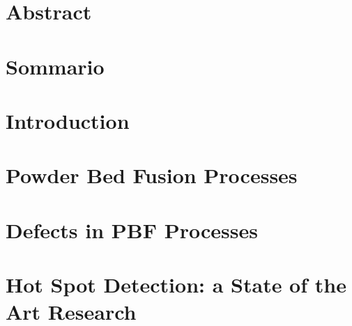 \documentclass{Configuration_Files/PoliMi3i_thesis}
\begin{document}
\chapter*{Abstract}



\chapter*{Sommario}

\cleardoublepage



\mainmatter %



\chapter{Introduction}
\label{ch:Introduction}%



\chapter{Powder Bed Fusion Processes}
\label{ch:Metal_AM}



\chapter{Defects in PBF Processes}
\label{ch:defects}



\chapter{Hot Spot Detection: a State of the Art Research}
\label{ch:state_ot_the_art}
 
\end{document}
